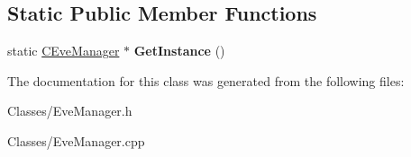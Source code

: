 \subsection*{Static Public Member Functions}
\begin{DoxyCompactItemize}
\item 
static \hyperlink{class_c_eve_manager}{C\+Eve\+Manager} $\ast$ {\bfseries Get\+Instance} ()\hypertarget{class_c_eve_manager_ae2b6a37be91de68fc22778eea00ad71a}{}\label{class_c_eve_manager_ae2b6a37be91de68fc22778eea00ad71a}

\end{DoxyCompactItemize}


The documentation for this class was generated from the following files\+:\begin{DoxyCompactItemize}
\item 
Classes/Eve\+Manager.\+h\item 
Classes/Eve\+Manager.\+cpp\end{DoxyCompactItemize}
